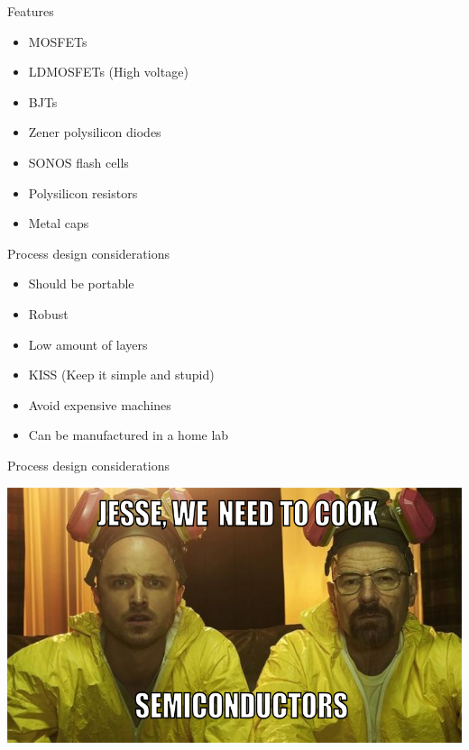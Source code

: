 \documentclass[aspectratio=169]{beamer}
\begin{document}
\begin{frame}{Features}
	\begin{itemize}
        \setlength\itemsep{1em}
		\item MOSFETs
		\item LDMOSFETs (High voltage) 
		\item BJTs
		\item Zener polysilicon diodes
		\item SONOS flash cells
		\item Polysilicon resistors
		\item Metal caps
	\end{itemize}
\end{frame}

\begin{frame}{Process design considerations}
	\begin{itemize}
		\item Should be portable
		\item Robust
		\item Low amount of layers
		\item KISS (Keep it simple and stupid)
		\item Avoid expensive machines
		\item Can be manufactured in a home lab
	\end{itemize}
\end{frame}

\begin{frame}{Process design considerations}
	\begin{center}
		\includegraphics[height=0.8\textheight]{images/breaking-bad.png}
	\end{center}
\end{frame}
\end{document}
